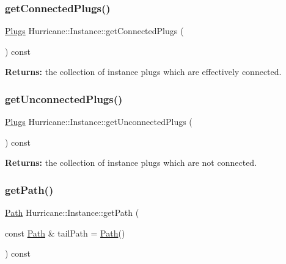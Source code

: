 \subsubsection{\texorpdfstring{get\+Connected\+Plugs()}{getConnectedPlugs()}}
{\footnotesize\ttfamily \mbox{\hyperlink{namespaceHurricane_ac8335d2057483ee7a935c15a9460c64f}{Plugs}} Hurricane\+::\+Instance\+::get\+Connected\+Plugs (\begin{DoxyParamCaption}{ }\end{DoxyParamCaption}) const}

{\bfseries Returns\+:} the collection of instance plugs which are effectively connected. \mbox{\label{classHurricane_1_1Instance_a9622b8b961f459469c275b3dafe1733c}} 
\subsubsection{\texorpdfstring{get\+Unconnected\+Plugs()}{getUnconnectedPlugs()}}
{\footnotesize\ttfamily \mbox{\hyperlink{namespaceHurricane_ac8335d2057483ee7a935c15a9460c64f}{Plugs}} Hurricane\+::\+Instance\+::get\+Unconnected\+Plugs (\begin{DoxyParamCaption}{ }\end{DoxyParamCaption}) const}

{\bfseries Returns\+:} the collection of instance plugs which are not connected. \mbox{\label{classHurricane_1_1Instance_a4d13f5b9294d0361b724b5824fd86378}} 
\subsubsection{\texorpdfstring{get\+Path()}{getPath()}}
{\footnotesize\ttfamily \mbox{\hyperlink{classHurricane_1_1Path}{Path}} Hurricane\+::\+Instance\+::get\+Path (\begin{DoxyParamCaption}\item[{const \mbox{\hyperlink{classHurricane_1_1Path}{Path}} \&}]{tail\+Path = {\ttfamily \mbox{\hyperlink{classHurricane_1_1Path}{Path}}()} }\end{DoxyParamCaption}) const}

